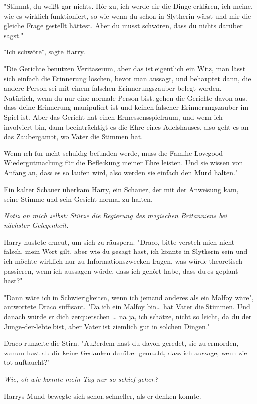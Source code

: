 {"Stimmt, du weißt gar nichts. Hör zu, ich werde dir die Dinge erklären, ich meine, wie es wirklich funktioniert, so wie wenn du schon in Slytherin wärst und mir die gleiche Frage gestellt hättest. Aber du musst schwören, dass du nichts darüber sagst."

"Ich schwöre", sagte Harry.

"Die Gerichte benutzen Veritaserum, aber das ist eigentlich ein Witz, man lässt sich einfach die Erinnerung löschen, bevor man aussagt, und behauptet dann, die andere Person sei mit einem falschen Erinnerungszauber belegt worden. Natürlich, wenn du nur eine normale Person bist, gehen die Gerichte davon aus, dass deine Erinnerung manipuliert ist und keinen falscher Erinnerungszauber im Spiel ist. Aber das Gericht hat einen Ermessensspielraum, und wenn ich involviert bin, dann beeinträchtigt es die Ehre eines Adelshauses, also geht es an das Zaubergamot, wo Vater die Stimmen hat.

Wenn ich für nicht schuldig befunden werde, muss die Familie Lovegood Wiedergutmachung für die Befleckung meiner Ehre leisten. Und sie wissen von Anfang an, dass es so laufen wird, also werden sie einfach den Mund halten."

Ein kalter Schauer überkam Harry, ein Schauer, der mit der Anweisung kam, seine Stimme und sein Gesicht normal zu halten.

\emph{Notiz an mich selbst: Stürze die Regierung des magischen Britanniens bei nächster Gelegenheit.}

Harry hustete erneut, um sich zu räuspern. "Draco, bitte versteh mich nicht falsch, mein Wort gilt, aber wie du gesagt hast, ich könnte in Slytherin sein und ich möchte wirklich nur zu Informationszwecken fragen, was würde theoretisch passieren, wenn ich aussagen würde, dass ich gehört habe, dass du es geplant hast?"

"Dann wäre ich in Schwierigkeiten, wenn ich jemand anderes als ein Malfoy wäre", antwortete Draco süffisant. "Da ich ein Malfoy bin… hat Vater die Stimmen. Und danach würde er dich zerquetschen … na ja, ich schätze, nicht so leicht, da du der Junge-der-lebte bist, aber Vater ist ziemlich gut in solchen Dingen."

Draco runzelte die Stirn. "Außerdem hast du davon geredet, sie zu ermorden, warum hast du dir keine Gedanken darüber gemacht, dass ich aussage, wenn sie tot auftaucht?"

\emph{Wie, oh wie konnte mein Tag nur so schief gehen?}

Harrys Mund bewegte sich schon schneller, als er denken konnte.

}
